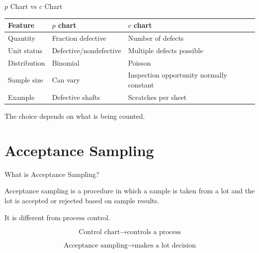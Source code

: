 \documentclass[aspectratio=169,10pt]{beamer}
\begin{document}

\begin{frame}[shrink=18]{$p$ Chart vs $c$ Chart}
\small

\begin{tabularx}{\textwidth}{YYY}
\toprule
Feature & $p$ chart & $c$ chart\\
\midrule
Quantity & Fraction defective & Number of defects\\
Unit status & Defective/nondefective & Multiple defects possible\\
Distribution & Binomial & Poisson\\
Sample size & Can vary & Inspection opportunity normally constant\\
Example & Defective shafts & Scratches per sheet\\
\bottomrule
\end{tabularx}

\vspace{6pt}

The choice depends on what is being counted.

\end{frame}


\section{Acceptance Sampling}

\begin{frame}[shrink=18]{What is Acceptance Sampling?}
\small

Acceptance sampling is a procedure in which a sample is taken
from a lot and the lot is accepted or rejected based on sample
results.

It is different from process control.

\[
\boxed{
\text{Control chart}
\rightarrow
\text{controls a process}
}
\]

\[
\boxed{
\text{Acceptance sampling}
\rightarrow
\text{makes a lot decision}
}
\]

\end{frame}

\end{document}
